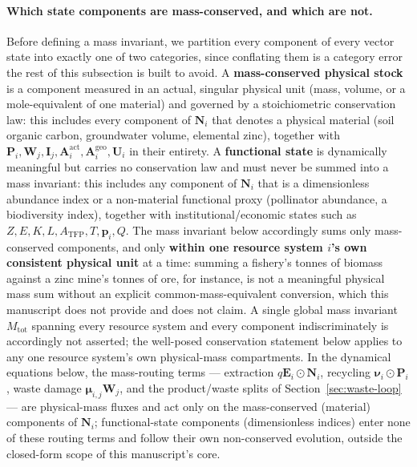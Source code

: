 \documentclass[twocolumn,10pt]{article}
\begin{document}
\paragraph{Which state components are mass-conserved, and which are not.} Before defining a mass invariant, we partition every component of every vector state into exactly one of two categories, since conflating them is a category error the rest of this subsection is built to avoid. A \textbf{mass-conserved physical stock} is a component measured in an actual, singular physical unit (mass, volume, or a mole-equivalent of one material) and governed by a stoichiometric conservation law: this includes every component of $\mathbf N_i$ that denotes a physical material (soil organic carbon, groundwater volume, elemental zinc), together with $\mathbf P_i,\mathbf W_j,\mathbf I_j,\mathbf A^{\text{act}}_i,\mathbf A^{\text{geo}}_i,\mathbf U_i$ in their entirety. A \textbf{functional state} is dynamically meaningful but carries no conservation law and must never be summed into a mass invariant: this includes any component of $\mathbf N_i$ that is a dimensionless abundance index or a non-material functional proxy (pollinator abundance, a biodiversity index), together with institutional/economic states such as $Z,E,K,L,A_{\text{TFP}},T,\mathbf p_i,Q$. The mass invariant below accordingly sums only mass-conserved components, and only \textbf{within one resource system $i$'s own consistent physical unit} at a time: summing a fishery's tonnes of biomass against a zinc mine's tonnes of ore, for instance, is not a meaningful physical mass sum without an explicit common-mass-equivalent conversion, which this manuscript does not provide and does not claim. A single global mass invariant $M_{\text{tot}}$ spanning every resource system and every component indiscriminately is accordingly not asserted; the well-posed conservation statement below applies to any one resource system's own physical-mass compartments. In the dynamical equations below, the mass-routing terms --- extraction $q\mathbf E_i\odot\mathbf N_i$, recycling $\boldsymbol\nu_i\odot\mathbf P_i$, waste damage $\boldsymbol\mu_{i,j}\mathbf W_j$, and the product/waste splits of Section~\ref{sec:waste-loop} --- are physical-mass fluxes and act only on the mass-conserved (material) components of $\mathbf N_i$; functional-state components (dimensionless indices) enter none of these routing terms and follow their own non-conserved evolution, outside the closed-form scope of this manuscript's core.
\end{document}
